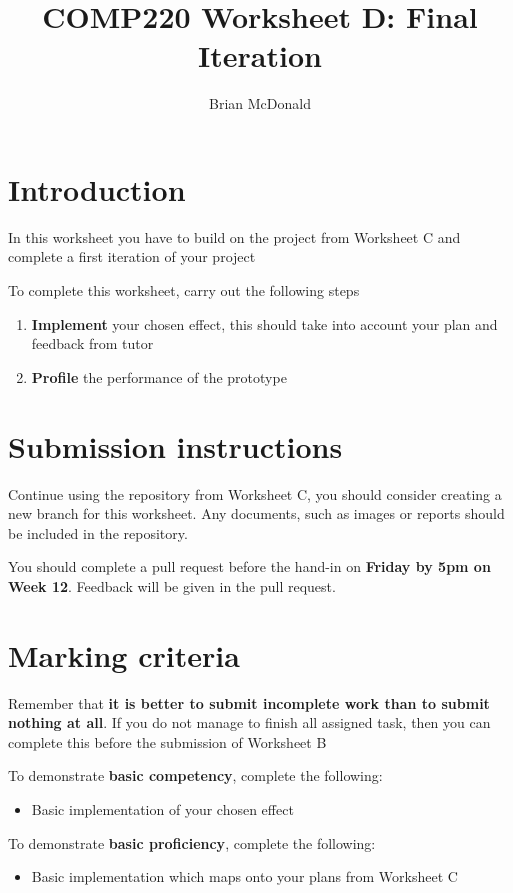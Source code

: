 \documentclass{../../../fal_assignment}
\title{COMP220 Worksheet D: Final Iteration}
\author{Brian McDonald}
\begin{document}
\maketitle

\section*{Introduction}

In this worksheet you have to build on the project from Worksheet C and complete a first iteration of your project

To complete this worksheet, carry out the following steps
\begin{enumerate}[label=(\alph*)]
	\item \textbf{Implement} your chosen effect, this should take into account your plan and feedback from tutor
	\item \textbf{Profile} the performance of the prototype
\end{enumerate}

\section*{Submission instructions}

Continue using the repository from Worksheet C, you should consider creating a new branch for this worksheet. Any documents, such as images or reports should be included in the repository.

You should complete a pull request before the hand-in on \textbf{Friday by 5pm on Week 12}. Feedback will be given in the pull request.

\section*{Marking criteria}

Remember that \textbf{it is better to submit incomplete work than to submit nothing at all}. If you do not manage to finish all assigned task, then you can complete this before the submission of Worksheet B

To demonstrate \textbf{basic competency}, complete the following:
\begin{itemize}
	\item Basic implementation of your chosen effect
\end{itemize} 

To demonstrate \textbf{basic proficiency}, complete the following:
\begin{itemize}
	\item Basic implementation which maps onto your plans from Worksheet C
\end{itemize}
\end{document}
